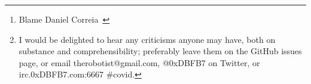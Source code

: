 \documentclass[paper.tex]{subfiles}
\begin{document}
\begin{abstract}
	Given that every route pursued consumes precious resources and attention, in retrospect, this was probably not a good use of time.\\
	
	It is perhaps notable that an entirely free and open-source software toolchain was used for the entire project; all instruments were custom-built and relatively inexpensive; and it is hopefully replicable by workers without biology equipment for under \$5000.
	
	
	\footnote{Blame \small{{Daniel Correia}\ }}
	
	\footnote{{I would be delighted to hear any criticisms anyone may have, both on substance and comprehensibility; preferably leave them on the GitHub issues page, or email therobotist@gmail.com, @0xDBFB7 on Twitter, or irc.0xDBFB7.com:6667 \#covid.}}

\end{abstract}

\end{document}
